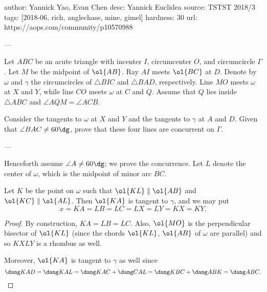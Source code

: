 author: Yannick Yao, Evan Chen
desc: Yannick Euclidea
source: TSTST 2018/3
tags: [2018-06, rich, anglechase, mine, gimel]
hardness: 30
url: https://aops.com/community/p10570988

---

Let $ABC$ be an acute triangle with incenter $I$, circumcenter $O$, and circumcircle $\Gamma$.
Let $M$ be the midpoint of $\ol{AB}$.
Ray $AI$ meets $\ol{BC}$ at $D$.
Denote by $\omega$ and $\gamma$ the circumcircles of $\triangle BIC$ and $\triangle BAD$, respectively.
Line $MO$ meets $\omega$ at $X$ and $Y$, while line $CO$ meets $\omega$ at $C$ and $Q$.
Assume that $Q$ lies inside $\triangle ABC$ and $\angle AQM = \angle ACB$.

Consider the tangents to $\omega$ at $X$ and $Y$ and the tangents to $\gamma$ at $A$ and $D$.
Given that $\angle BAC \neq 60\dg$, prove that these four lines are concurrent on $\Gamma$.

---


Henceforth assume $\angle A \neq 60\dg$; we prove the concurrence.
Let $L$ denote the center of $\omega$, which is the midpoint of minor arc $BC$.

\begin{claim*}
  Let $K$ be the point on $\omega$ such that
  $\ol{KL} \parallel \ol{AB}$ and $\ol{KC} \parallel \ol{AL}$.
  Then $\ol{KA}$ is tangent to $\gamma$, and we may put
  \[ x = KA = LB = LC = LX = LY = KX = KY. \]
\end{claim*}
\begin{proof}
  By construction, $KA = LB = LC$.
  Also, $\ol{MO}$ is the perpendicular bisector of $\ol{KL}$
  (since the chords $\ol{KL}$, $\ol{AB}$ of $\omega$ are parallel)
  and so $KXLY$ is a rhombus as well.

  Moreover, $\ol{KA}$ is tangent to $\gamma$ as well since
  \[ \dang KAD = \dang KAL = \dang KAC + \dang CAL
    = \dang KBC + \dang ABK = \dang ABC. \qedhere \]
\end{proof}

